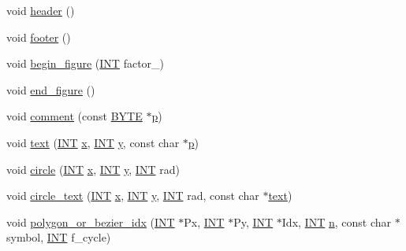 \begin{DoxyCompactItemize}
\item 
void \mbox{\hyperlink{classmp__graphics_ad500b1cac8c75bf8a2f2ac78938c4e30}{header}} ()
\item 
void \mbox{\hyperlink{classmp__graphics_a20ae36e3dae7401578c7623f73419fe8}{footer}} ()
\item 
void \mbox{\hyperlink{classmp__graphics_a5755257d778fb161984a756d0ad9c600}{begin\+\_\+figure}} (\mbox{\hyperlink{galois_8h_a09fddde158a3a20bd2dcadb609de11dc}{I\+NT}} factor\+\_)
\item 
void \mbox{\hyperlink{classmp__graphics_af7e758a9c83d809d033e1d18752d2925}{end\+\_\+figure}} ()
\item 
void \mbox{\hyperlink{classmp__graphics_af0d4cac1ddab54c0da9a28bd9f337680}{comment}} (const \mbox{\hyperlink{galois_8h_ab6cc7b4aeb6ea31aba2b3fbfc83ff5e6}{B\+Y\+TE}} $\ast$\mbox{\hyperlink{alphabet2_8_c_a533391314665d6bf1b5575e9a9cd8552}{p}})
\item 
void \mbox{\hyperlink{classmp__graphics_ae92ece77cf1942bfee760d6cf854b74b}{text}} (\mbox{\hyperlink{galois_8h_a09fddde158a3a20bd2dcadb609de11dc}{I\+NT}} \mbox{\hyperlink{alphabet2_8_c_a6150e0515f7202e2fb518f7206ed97dc}{x}}, \mbox{\hyperlink{galois_8h_a09fddde158a3a20bd2dcadb609de11dc}{I\+NT}} \mbox{\hyperlink{alphabet2_8_c_a0a2f84ed7838f07779ae24c5a9086d33}{y}}, const char $\ast$\mbox{\hyperlink{alphabet2_8_c_a533391314665d6bf1b5575e9a9cd8552}{p}})
\item 
void \mbox{\hyperlink{classmp__graphics_a0e1e32cdfd93dd41678a1dda2671ab6e}{circle}} (\mbox{\hyperlink{galois_8h_a09fddde158a3a20bd2dcadb609de11dc}{I\+NT}} \mbox{\hyperlink{alphabet2_8_c_a6150e0515f7202e2fb518f7206ed97dc}{x}}, \mbox{\hyperlink{galois_8h_a09fddde158a3a20bd2dcadb609de11dc}{I\+NT}} \mbox{\hyperlink{alphabet2_8_c_a0a2f84ed7838f07779ae24c5a9086d33}{y}}, \mbox{\hyperlink{galois_8h_a09fddde158a3a20bd2dcadb609de11dc}{I\+NT}} rad)
\item 
void \mbox{\hyperlink{classmp__graphics_aa50563fd445efab70c7abc5700c6049b}{circle\+\_\+text}} (\mbox{\hyperlink{galois_8h_a09fddde158a3a20bd2dcadb609de11dc}{I\+NT}} \mbox{\hyperlink{alphabet2_8_c_a6150e0515f7202e2fb518f7206ed97dc}{x}}, \mbox{\hyperlink{galois_8h_a09fddde158a3a20bd2dcadb609de11dc}{I\+NT}} \mbox{\hyperlink{alphabet2_8_c_a0a2f84ed7838f07779ae24c5a9086d33}{y}}, \mbox{\hyperlink{galois_8h_a09fddde158a3a20bd2dcadb609de11dc}{I\+NT}} rad, const char $\ast$\mbox{\hyperlink{classmp__graphics_ae92ece77cf1942bfee760d6cf854b74b}{text}})
\item 
void \mbox{\hyperlink{classmp__graphics_ac67f20507b7b4f592e9ed90aaa1f472a}{polygon\+\_\+or\+\_\+bezier\+\_\+idx}} (\mbox{\hyperlink{galois_8h_a09fddde158a3a20bd2dcadb609de11dc}{I\+NT}} $\ast$Px, \mbox{\hyperlink{galois_8h_a09fddde158a3a20bd2dcadb609de11dc}{I\+NT}} $\ast$Py, \mbox{\hyperlink{galois_8h_a09fddde158a3a20bd2dcadb609de11dc}{I\+NT}} $\ast$Idx, \mbox{\hyperlink{galois_8h_a09fddde158a3a20bd2dcadb609de11dc}{I\+NT}} \mbox{\hyperlink{simeon_8_c_a7f2cd26777ce0ff3fdaf8d02aacbddfb}{n}}, const char $\ast$symbol, \mbox{\hyperlink{galois_8h_a09fddde158a3a20bd2dcadb609de11dc}{I\+NT}} f\+\_\+cycle)

\end{DoxyCompactItemize}
